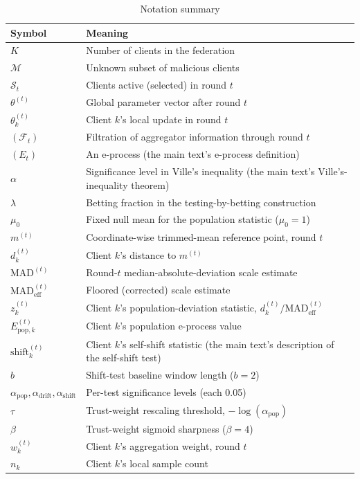 \documentclass[a4paper,11pt]{article}
\begin{document}
\begin{table}[htbp]
\centering
\caption{Notation summary}\label{tab:notation}
\begin{tabular}{@{}ll@{}}
\toprule
Symbol & Meaning \\
\midrule
$K$ & Number of clients in the federation \\
$\mathcal{M}$ & Unknown subset of malicious clients \\
$\mathcal{S}_t$ & Clients active (selected) in round $t$ \\
$\theta^{(t)}$ & Global parameter vector after round $t$ \\
$\theta_k^{(t)}$ & Client $k$'s local update in round $t$ \\
$(\mathcal{F}_t)$ & Filtration of aggregator information through round $t$ \\
$(E_t)$ & An e-process (the main text's e-process definition) \\
$\alpha$ & Significance level in Ville's inequality (the main text's Ville's-inequality theorem) \\
$\lambda$ & Betting fraction in the testing-by-betting construction \\
$\mu_0$ & Fixed null mean for the population statistic ($\mu_0=1$) \\
$m^{(t)}$ & Coordinate-wise trimmed-mean reference point, round $t$ \\
$d_k^{(t)}$ & Client $k$'s distance to $m^{(t)}$ \\
$\mathrm{MAD}^{(t)}$ & Round-$t$ median-absolute-deviation scale estimate \\
$\mathrm{MAD}^{(t)}_{\mathrm{eff}}$ & Floored (corrected) scale estimate \\
$z_k^{(t)}$ & Client $k$'s population-deviation statistic, $d_k^{(t)}/\mathrm{MAD}^{(t)}_{\mathrm{eff}}$ \\
$E_{\mathrm{pop},k}^{(t)}$ & Client $k$'s population e-process value \\
$\mathrm{shift}_k^{(t)}$ & Client $k$'s self-shift statistic (the main text's description of the self-shift test) \\
$b$ & Shift-test baseline window length ($b=2$) \\
$\alpha_{\mathrm{pop}}, \alpha_{\mathrm{drift}}, \alpha_{\mathrm{shift}}$ & Per-test significance levels (each 0.05) \\
$\tau$ & Trust-weight rescaling threshold, $-\log(\alpha_{\mathrm{pop}})$ \\
$\beta$ & Trust-weight sigmoid sharpness ($\beta=4$) \\
$w_k^{(t)}$ & Client $k$'s aggregation weight, round $t$ \\
$n_k$ & Client $k$'s local sample count \\
\bottomrule
\end{tabular}
\end{table}
\end{document}
